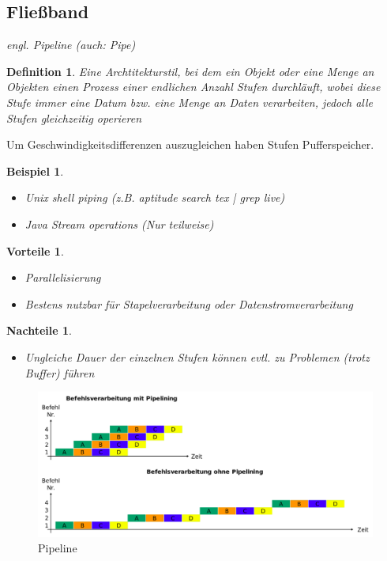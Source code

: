 \documentclass[a4paper]{article}
\theoremstyle{break}
\newtheorem{defi}{Definition}[section]
\newtheorem{ex}{Beispiel}[section]
\newtheorem{why}{Vorteile}[section]
\newtheorem{whynot}{Nachteile}[section]
\begin{document}
\subsection{Fließband}
\textit{engl. Pipeline (auch: Pipe)}
\begin{defi}
	Eine Archtitekturstil, bei dem ein Objekt oder eine Menge an Objekten einen Prozess einer endlichen Anzahl Stufen durchläuft, wobei diese Stufe immer eine Datum bzw. eine Menge an Daten verarbeiten, jedoch alle Stufen gleichzeitig operieren
\end{defi}
Um Geschwindigkeitsdifferenzen auszugleichen haben Stufen Pufferspeicher.
\begin{ex}
	\begin{itemize}
		\item Unix shell piping (z.B. aptitude search tex | grep live)
		\item Java Stream operations (Nur teilweise)
	\end{itemize}
\end{ex}
\begin{why}
	\begin{itemize}
		\item Parallelisierung
		\item Bestens nutzbar für Stapelverarbeitung oder Datenstromverarbeitung
	\end{itemize}
\end{why}
\begin{whynot}
	\begin{itemize}
		\item Ungleiche Dauer der einzelnen Stufen können evtl. zu Problemen (trotz Buffer) führen
	\end{itemize}
\end{whynot}
\begin{figure}[H]
	\centering
	\includegraphics[width=\textwidth]{../diagrams/misc/pipeline.png}
	\caption{Pipeline}
\end{figure}
\end{document}
